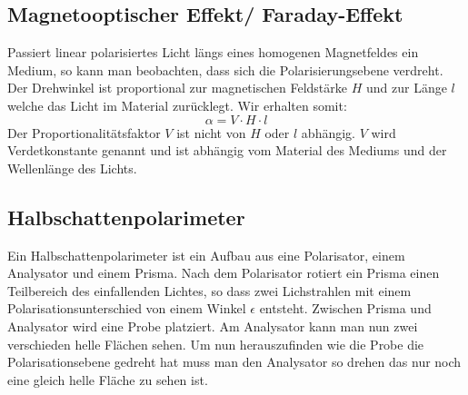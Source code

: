 \subsection{Magnetooptischer Effekt/ Faraday-Effekt}
Passiert linear polarisiertes Licht längs eines homogenen Magnetfeldes ein Medium, so kann man beobachten, dass sich die Polarisierungsebene verdreht. Der Drehwinkel ist proportional zur magnetischen Feldstärke $H$ und zur Länge $l$ welche das Licht im Material zurücklegt. Wir erhalten somit:
\[ \alpha = V \cdot H \cdot l \]
Der Proportionalitätsfaktor $V$ ist nicht von $H$ oder $l$ abhängig. $V$ wird Verdetkonstante genannt und ist abhängig vom Material des Mediums und der Wellenlänge des Lichts.
\subsection{Halbschattenpolarimeter}
Ein Halbschattenpolarimeter ist ein Aufbau aus eine Polarisator, einem Analysator und einem Prisma. Nach dem Polarisator rotiert ein Prisma einen Teilbereich des einfallenden Lichtes, so dass zwei Lichstrahlen mit einem Polarisationsunterschied von einem Winkel $\epsilon$ entsteht. Zwischen Prisma und Analysator wird eine Probe platziert. Am Analysator kann man nun zwei verschieden helle Flächen sehen. Um nun herauszufinden wie die Probe die Polarisationsebene gedreht hat muss man den Analysator so drehen das nur noch eine gleich helle Fläche zu sehen ist.